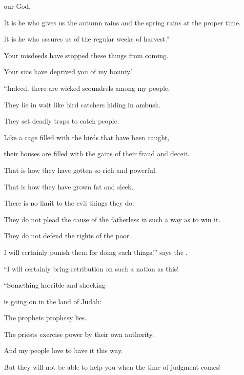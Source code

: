 {{}
our God.
\par }{\Q It
is he who gives
us the autumn
rains
and the spring rains
at the proper time.
\par }{\Q It is he who assures
us of the regular weeks
of harvest.”
\par }{\Q {}Your misdeeds
have stopped these
things from
coming.

\par }{\Q Your sins
have deprived
you of my bounty.’
\par }{\Q {}“Indeed,
there
are wicked
scoundrels among
my people.
\par }{\Q They lie in wait like bird catchers
hiding in ambush.

\par }{\Q They set
deadly traps
to catch
people.
\par }{\Q {}Like a cage
filled
with the birds
that
have been
caught,

\par }{\Q their houses
are filled
with the gains of their fraud and deceit.
\par }{\Q That is
how
they have
gotten so
rich and powerful.
\par }{\Q {}That is how they
have
grown fat
and sleek.
\par }{\Q There
is no limit to the evil
things they do.

\par }{\Q They do not
plead
the cause
of the fatherless
in such a way as to win
it.
\par }{\Q They do not
defend
the rights
of the poor.
\par }{\Q {}I will certainly
punish
them for doing such things!” says
the {}.
\par }{\Q “I will certainly bring retribution
on
such
a nation
as
this!
\par }{\Q {}“Something horrible
and shocking
\par }{\Q is going on
in the land of Judah:
\par }{\Q {}The prophets
prophesy
lies.
\par }{\Q The priests
exercise
power
by their own authority.

\par }{\Q And my people
love
to have it this
way.
\par }{\Q But they will not be able to help you when the time of judgment comes!

\par }
